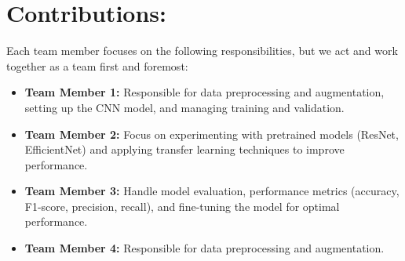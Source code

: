 \documentclass[12pt]{article}
\begin{document}
\section*{Contributions:}
Each team member focuses on the following responsibilities, but we act and work together as a team first and foremost:
\begin{itemize}
    \item \textbf{Team Member 1:} Responsible for data preprocessing and augmentation, setting up the CNN model, and managing training and validation.
    \item \textbf{Team Member 2:} Focus on experimenting with pretrained models (ResNet, EfficientNet) and applying transfer learning techniques to improve performance.
    \item \textbf{Team Member 3:} Handle model evaluation, performance metrics (accuracy, F1-score, precision, recall), and fine-tuning the model for optimal performance.
    \item \textbf{Team Member 4:} Responsible for data preprocessing and augmentation.
\end{itemize}
\end{document}

